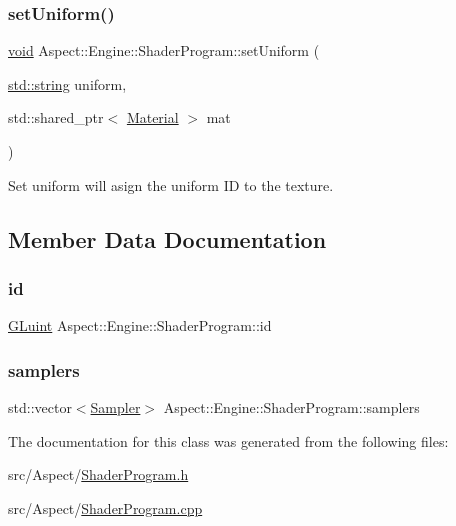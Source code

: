 \subsubsection{\texorpdfstring{set\+Uniform()}{setUniform()}\hspace{0.1cm}{\footnotesize\ttfamily [4/4]}}
{\footnotesize\ttfamily \mbox{\hyperlink{_s_d_l__opengles2__gl2ext_8h_ae5d8fa23ad07c48bb609509eae494c95}{void}} Aspect\+::\+Engine\+::\+Shader\+Program\+::set\+Uniform (\begin{DoxyParamCaption}\item[{\mbox{\hyperlink{_s_d_l__opengl__glext_8h_ae84541b4f3d8e1ea24ec0f466a8c568b}{std\+::string}}}]{uniform,  }\item[{std\+::shared\+\_\+ptr$<$ \mbox{\hyperlink{class_aspect_1_1_engine_1_1_material}{Material}} $>$}]{mat }\end{DoxyParamCaption})}



Set uniform will asign the uniform ID to the texture. 



\subsection{Member Data Documentation}
\mbox{\label{class_aspect_1_1_engine_1_1_shader_program_ad0427969ef1bc979a2da581799600b43}} 
\subsubsection{\texorpdfstring{id}{id}}
{\footnotesize\ttfamily \mbox{\hyperlink{glew_8h_a68c4714e43d8e827d80759f9cb864f3c}{G\+Luint}} Aspect\+::\+Engine\+::\+Shader\+Program\+::id\hspace{0.3cm}{\ttfamily [private]}}

\mbox{\label{class_aspect_1_1_engine_1_1_shader_program_a30a7520fca74b5c529368bd6675ba79f}} 
\subsubsection{\texorpdfstring{samplers}{samplers}}
{\footnotesize\ttfamily std\+::vector$<$\mbox{\hyperlink{struct_aspect_1_1_engine_1_1_sampler}{Sampler}}$>$ Aspect\+::\+Engine\+::\+Shader\+Program\+::samplers\hspace{0.3cm}{\ttfamily [private]}}



The documentation for this class was generated from the following files\+:\begin{DoxyCompactItemize}
\item 
src/\+Aspect/\mbox{\hyperlink{_shader_program_8h}{Shader\+Program.\+h}}\item 
src/\+Aspect/\mbox{\hyperlink{_shader_program_8cpp}{Shader\+Program.\+cpp}}\end{DoxyCompactItemize}
